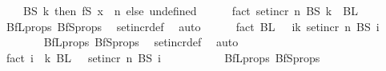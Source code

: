 \begin{isabellebody}
\ \ \ \ {\isacharparenleft}{\kern0pt}BS\ k{\isacharparenright}{\kern0pt}\ then\ fS\ {\isacharparenleft}{\kern0pt}x\ {\isacharminus}{\kern0pt}\ n{\isacharparenright}{\kern0pt}\ else\ undefined{\isacharparenright}{\kern0pt}{\isacharparenright}{\kern0pt}{\isacharparenright}{\kern0pt}{\isachardoublequoteclose}\isanewline
\isanewline
\ \ \ \ \isamarkupfalse%
\ fact{}{\isacharcolon}{\kern0pt}\ {\isachardoublequoteopen}set{\isacharunderscore}{\kern0pt}incr\ n\ {\isacharparenleft}{\kern0pt}BS\ k{\isacharparenright}{\kern0pt}\ {\isasyminter}\ BL\ {}\ {\isacharequal}{\kern0pt}\ {\isacharbraceleft}{\kern0pt}{\isacharbraceright}{\kern0pt}{\isachardoublequoteclose}\ \ \isamarkupfalse%
\ BfL{\isacharunderscore}{\kern0pt}props\ BfS{\isacharunderscore}{\kern0pt}props\ \isamarkupfalse%
\ set{\isacharunderscore}{\kern0pt}incr{\isacharunderscore}{\kern0pt}def\ \isamarkupfalse%
\ auto\isanewline
\ \ \ \ \isamarkupfalse%
\ fact{}{\isacharcolon}{\kern0pt}\ {\isachardoublequoteopen}BL\ {}\ {\isasyminter}\ {\isacharparenleft}{\kern0pt}{\isasymUnion}i{\isasymin}{\isacharbraceleft}{\kern0pt}{\isachardot}{\kern0pt}{\isachardot}{\kern0pt}{\isacharless}{\kern0pt}k{\isacharbraceright}{\kern0pt}{\isachardot}{\kern0pt}\ set{\isacharunderscore}{\kern0pt}incr\ n\ {\isacharparenleft}{\kern0pt}BS\ i{\isacharparenright}{\kern0pt}{\isacharparenright}{\kern0pt}\ {\isacharequal}{\kern0pt}\ {\isacharbraceleft}{\kern0pt}{\isacharbraceright}{\kern0pt}{\isachardoublequoteclose}\ \isanewline
\ \ \ \ \ \ \isamarkupfalse%
\ BfL{\isacharunderscore}{\kern0pt}props\ BfS{\isacharunderscore}{\kern0pt}props\ \isamarkupfalse%
\ set{\isacharunderscore}{\kern0pt}incr{\isacharunderscore}{\kern0pt}def\ \isamarkupfalse%
\ auto\isanewline
\ \ \ \ \isamarkupfalse%
\ fact{}{\isacharcolon}{\kern0pt}\ {\isachardoublequoteopen}{\isasymforall}i\ {\isasymin}\ {\isacharbraceleft}{\kern0pt}{\isachardot}{\kern0pt}{\isachardot}{\kern0pt}{\isacharless}{\kern0pt}k{\isacharbraceright}{\kern0pt}{\isachardot}{\kern0pt}\ BL\ {}\ {\isasyminter}\ set{\isacharunderscore}{\kern0pt}incr\ n\ {\isacharparenleft}{\kern0pt}BS\ i{\isacharparenright}{\kern0pt}\ {\isacharequal}{\kern0pt}\ {\isacharbraceleft}{\kern0pt}{\isacharbraceright}{\kern0pt}{\isachardoublequoteclose}\ \isanewline
\ \ \ \ \ \ \isamarkupfalse%
\ BfL{\isacharunderscore}{\kern0pt}props\ BfS{\isacharunderscore}{\kern0pt}props\ \isamarkupfalse%

\end{isabellebody}
